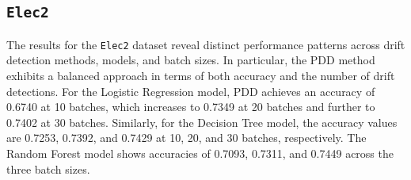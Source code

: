 \documentclass[pdflatex,sn-mathphys-ay]{sn-jnl}%
\theoremstyle{thmstyleone}%
\theoremstyle{thmstyletwo}%
\theoremstyle{thmstylethree}%
\begin{document}
\subsection*{\texttt{Elec2}}

The results for the \texttt{Elec2} dataset reveal distinct performance patterns across drift detection methods, models, and batch sizes. In particular, the PDD method exhibits a balanced approach in terms of both accuracy and the number of drift detections. For the Logistic Regression model, PDD achieves an accuracy of 0.6740 at 10 batches, which increases to 0.7349 at 20 batches and further to 0.7402 at 30 batches. Similarly, for the Decision Tree model, the accuracy values are 0.7253, 0.7392, and 0.7429 at 10, 20, and 30 batches, respectively. The Random Forest model shows accuracies of 0.7093, 0.7311, and 0.7449 across the three batch sizes.
\end{document}
